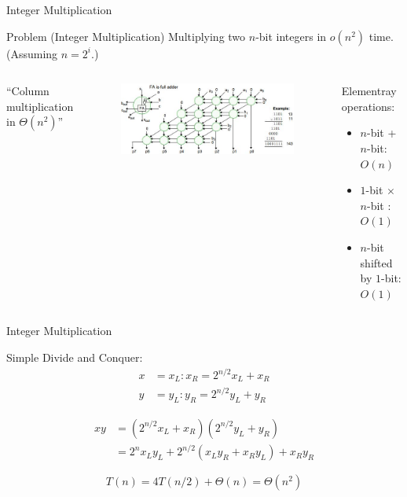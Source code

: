 \documentclass{beamer}
\begin{document}
\begin{frame}{Integer Multiplication}
  \begin{exampleblock}{Problem (Integer Multiplication)}
    Multiplying two $n$-bit integers in $o(n^2)$ time. {\small (Assuming $n =
    2^i$.)}
  \end{exampleblock}

  \vspace{0.50cm}

  \begin{columns}
      ``Column multiplication in $\Theta(n^2)$''
	  \begin{figure}[htp]
		\begin{center}
		  \includegraphics[width = 1.0\textwidth]{figure/bit-multiplication.jpg}
		\end{center}
  	  \end{figure}
	  \begin{block}{Elementray operations:}
		\begin{itemize}
		  \item $n$-bit + $n$-bit: $O(n)$
		  \item $1$-bit $\times$ $n$-bit : $O(1)$
		  \item $n$-bit shifted by $1$-bit: $O(1)$
		\end{itemize}
	  \end{block}
  \end{columns}
\end{frame}
\begin{frame}{Integer Multiplication}
  \begin{block}{Simple Divide and Conquer:}
  \begin{align*}
    x & = x_L : x_R = 2^{n/2} x_L + x_R  \\
    y & = y_L : y_R = 2^{n/2} y_L + y_R
  \end{align*}

  \begin{align*}
    xy & = (2^{n/2} x_L + x_R) (2^{n/2} y_L + y_R) \\
       & = 2^{n} x_L y_L + 2^{n/2} (x_L y_R + x_R y_L) + x_R y_R
  \end{align*}

  \[
    T(n) = 4T(n/2) + \Theta(n) = \Theta(n^2)
  \]
  \end{block}
\end{frame}
\end{document}
